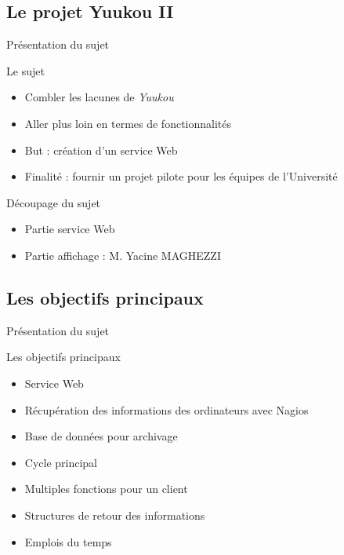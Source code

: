 
\subsection{Le projet Yuukou II}

\begin{frame}{Pr\'esentation du sujet}
	\begin{block}{Le sujet}
		\begin{itemize}
			\item Combler les lacunes de \textit{Yuukou}
			\item Aller plus loin en termes de fonctionnalit\'es
			\item But : cr\'eation d'un service Web
			\item Finalit\'e : fournir un projet pilote pour les \'equipes de l'Universit\'e
			
		\end{itemize}
		
	\end{block}
	
	\begin{block}{D\'ecoupage du sujet}
		\begin{itemize}
			\item Partie service Web
			\item Partie affichage : M. Yacine MAGHEZZI
			
		\end{itemize}
		
	\end{block}
	
\end{frame}


\subsection{Les objectifs principaux}

\begin{frame}{Pr\'esentation du sujet}
	\begin{block}{Les objectifs principaux}
		\begin{itemize}
			\item Service Web
			\item R\'ecup\'eration des informations des ordinateurs avec Nagios
			\item Base de donn\'ees pour archivage
			\item Cycle principal
			\item Multiples fonctions pour un client
			\item Structures de retour des informations
			\item Emplois du temps
			
		\end{itemize}
		
	\end{block}
	
\end{frame}

